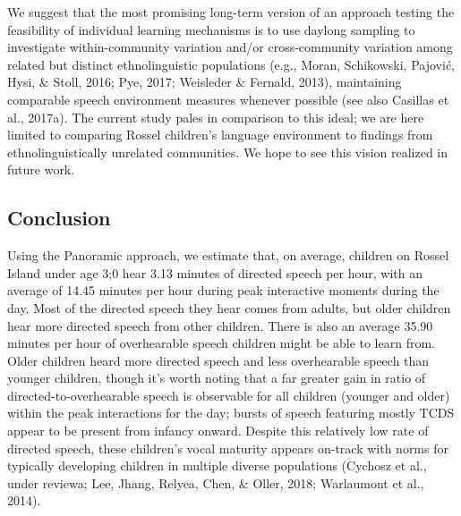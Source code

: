 \documentclass[,man,floatsintext]{apa6}
\begin{document}
We suggest that the most promising long-term version of an approach
testing the feasibility of individual learning mechanisms is to use
daylong sampling to investigate within-community variation and/or
cross-community variation among related but distinct ethnolinguistic
populations (e.g., Moran, Schikowski, Pajović, Hysi, \& Stoll, 2016;
Pye, 2017; Weisleder \& Fernald, 2013), maintaining comparable speech
environment measures whenever possible (see also Casillas et al.,
2017a). The current study pales in comparison to this ideal; we are here
limited to comparing Rossel children's language environment to findings
from ethnolinguistically unrelated communities. We hope to see this
vision realized in future work.

\subsection{Conclusion}\label{disc-conclusion}

Using the Panoramic approach, we estimate that, on average, children on
Rossel Island under age 3;0 hear 3.13 minutes of directed speech per
hour, with an average of 14.45 minutes per hour during peak interactive
moments during the day. Most of the directed speech they hear comes from
adults, but older children hear more directed speech from other
children. There is also an average 35.90 minutes per hour of
overhearable speech children might be able to learn from. Older children
heard more directed speech and less overhearable speech than younger
children, though it's worth noting that a far greater gain in ratio of
directed-to-overhearable speech is observable for all children (younger
and older) within the peak interactions for the day; bursts of speech
featuring mostly TCDS appear to be present from infancy onward. Despite
this relatively low rate of directed speech, these children's vocal
maturity appears on-track with norms for typically developing children
in multiple diverse populations (Cychosz et al., under reviewa; Lee,
Jhang, Relyea, Chen, \& Oller, 2018; Warlaumont et al., 2014).
\end{document}
